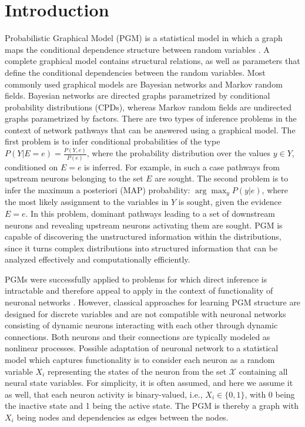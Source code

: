 \documentclass[letterpaper,11pt]{article}
\newcommand\tab[1][6mm]{\hspace*{#1}}
\begin{document}
\section{Introduction}
\tab Probabilistic Graphical Model (PGM) is a statistical model in which a graph maps the conditional dependence structure between random variables \cite{nutshell,Koller,Murphy}. A complete graphical model contains structural relations, as well as parameters that define the conditional dependencies between the random variables. Most commonly used graphical models are Bayesian networks and Markov random fields. Bayesian networks are directed graphs parametrized by conditional probability distributions (CPDs), whereas Markov random fields are undirected graphs parametrized by factors. There are two types of inference problems in the context of network pathways that can be answered using a graphical model. The first problem is to infer conditional probabilities of the type $P(Y|E=e)=\frac{P(Y,e)}{P(e)}$, where the probability distribution over the values $y \in Y$, conditioned on $E=e$ is inferred. For example, in such a case pathways from upstream neurons belonging to the set $E$ are sought. The second problem is to infer the maximum a posteriori (MAP) probability: $\arg\max_y P(y|e)$, where the most likely assignment to the variables in $Y$ is sought, given the evidence $E=e$. In this problem, dominant pathways leading to a set of downstream neurons and revealing upstream neurons activating them are sought. PGM is capable of discovering the unstructured information within the distributions, since it turns complex distributions into structured information that can be analyzed effectively and computationally efficiently.

PGMs were successfully applied to problems for which direct inference is intractable and therefore appeal to apply in the context of functionality of neuronal networks \cite{Koller}.  However, classical approaches for learning PGM structure are designed for discrete variables and are not compatible with neuronal networks consisting of dynamic neurons interacting with each other through dynamic connections. Both neurons and their connections are typically modeled as nonlinear processes. Possible adaptation of neuronal network to a statistical model which captures functionality is to consider each neuron as a random variable $X_i$ representing the states of the neuron from the set $\mathcal{X}$ containing all neural state variables. For simplicity, it is often assumed, and here we assume it as well, that each neuron activity is binary-valued, i.e., $X_i\in \{0,1\}$, with 0 being the inactive state and 1 being the active state. The PGM is thereby a graph with $X_i$ being nodes and dependencies as edges between the nodes.
\end{document}
